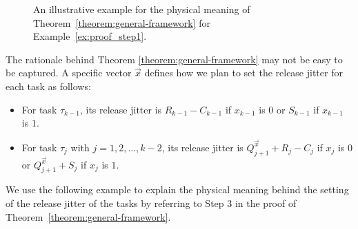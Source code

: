 \begin{figure*}[t]

\caption{An illustrative example for  the physical meaning of
  Theorem~\ref{theorem:general-framework} for Example~\ref{ex:proof_step1}.}
\label{fig:example-imaginary}  
\end{figure*}
The rationale behind Theorem \ref{theorem:general-framework} may not
be easy to be captured. A specific vector $\vec{x}$ defines how
we plan to set the release jitter for each task as follows:
\begin{itemize}
\item For task $\tau_{k-1}$, its release jitter is $R_{k-1}-C_{k-1}$
  if $x_{k-1}$ is $0$ or $S_{k-1}$ if $x_{k-1}$ is $1$.
\item For task $\tau_j$ with $j=1,2,\ldots,k-2$, its release jitter
  is
  $Q_{j+1}^{\vec{x}} + R_j-C_j$ if $x_j$ is $0$ or $Q_{j+1}^{\vec{x}}
  + S_j$ if $x_j$ is $1$.
\end{itemize}
We use the following example to explain the physical meaning
behind the setting of the release jitter of the tasks by referring to
Step 3 in the proof of Theorem~\ref{theorem:general-framework}.

